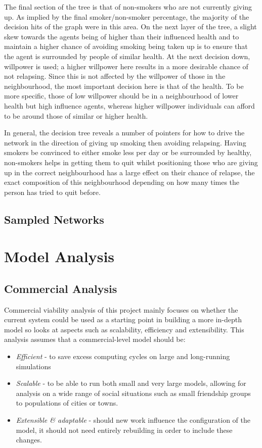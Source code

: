 \documentclass[]{report}
\begin{document}
The final section of the tree is that of non-smokers who are not currently giving up. As implied by the final smoker/non-smoker percentage, the majority of the decision hits of the graph were in this area. On the next layer of the tree, a slight skew towards the agents being of higher than their influenced health and to maintain a higher chance of avoiding smoking being taken up is to ensure that the agent is surrounded by people of similar health. At the next decision down, willpower is used; a higher willpower here results in a more desirable chance of not relapsing. Since this is not affected by the willpower of those in the neighbourhood, the most important decision here is that of the health. To be more specific, those of low willpower should be in a neighbourhood of lower health but high influence agents, whereas higher willpower individuals can afford to be around those of similar or higher health.

In general, the decision tree reveals a number of pointers for how to drive the network in the direction of giving up smoking then avoiding relapsing. Having smokers be convinced to either smoke less per day or be surrounded by healthy, non-smokers helps in getting them to quit whilst positioning those who are giving up in the correct neighbourhood has a large effect on their chance of relapse, the exact composition of this neighbourhood depending on how many times the person has tried to quit before.

\subsection{Sampled Networks}










\section{Model Analysis}
\subsection{Commercial Analysis}

Commercial viability analysis of this project mainly focuses on whether the current system could be used as a starting point in building a more in-depth model so looks at aspects such as scalability, efficiency and extensibility. This analysis assumes that a commercial-level model should be:
\begin{itemize}
\item \emph{Efficient} - to save excess computing cycles on large and long-running simulations
\item \emph{Scalable} - to be able to run both small and very large models, allowing for analysis on a wide range of social situations such as small friendship groups to populations of cities or towns.
\item \emph{Extensible \& adaptable} - should new work influence the configuration of the model, it should not need entirely rebuilding in order to include these changes.
\end{itemize}
\end{document}
